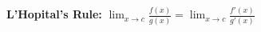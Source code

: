 \documentclass[preview]{standalone}
\begin{document}
\begin{center}
\textbf{L'Hopital's Rule:} $ \lim_{x \to c} \frac{f(x)}{g(x)} = \lim_{x \to c} \frac{f'(x)}{g'(x)}$
\end{center}
\end{document}
